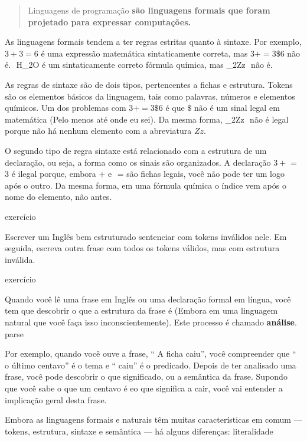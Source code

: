 \documentclass[10pt]{book}
\begin{document}
\begin{quote}
{Linguagens de programação \bf são linguagens formais que foram
projetado para expressar computações.}
\end{quote}

As linguagens formais tendem a ter regras estritas quanto à sintaxe. Por exemplo,
$ 3 + 3 = 6 $ é uma expressão matemática sintaticamente correta, mas 
$ 3 + = 3 \mbox {\$} 6 $ não é.
$ $ H_2O é um sintaticamente correto
fórmula química, mas _2Zz $ $ não é.

As regras de sintaxe são de dois tipos, pertencentes a {fichas \bf} e
estrutura. Tokens são os elementos básicos da linguagem, tais como
palavras, números e elementos químicos. Um dos problemas com
$ 3 + = 3 \mbox {\$} 6 $ é que \(\$ \) não é um sinal legal em matemática
(Pelo menos até onde eu sei). Da mesma forma, _2Zz $ $ não é legal porque
não há nenhum elemento com a abreviatura $ Zz $.

O segundo tipo de regra sintaxe está relacionado com a estrutura de um
declaração, ou seja, a forma como os sinais são organizados. A declaração
$ 3 + $ = 3 é ilegal porque, embora $ + $ e $ $ = são
fichas legais, você não pode ter um logo após o outro. Da mesma forma,
em uma fórmula química o índice vem após o nome do elemento, não
antes.

\begin{} exercício

Escrever um Inglês bem estruturado
sentenciar com tokens inválidos nele. Em seguida, escreva outra frase
com todos os tokens válidos, mas com estrutura inválida.

\end{} exercício

Quando você lê uma frase em Inglês ou uma declaração formal em
língua, você tem que descobrir o que a estrutura da frase é
(Embora em uma linguagem natural que você faça isso inconscientemente). Este
processo é chamado {\bf análise}.
\index{} parse

Por exemplo, quando você ouve a frase, `` A ficha caiu'', você
compreender que `` o último centavo'' é o tema e `` caiu'' é o
predicado. Depois de ter analisado uma frase, você pode descobrir o que
significado, ou a semântica da frase. Supondo que você sabe
o que um centavo é eo que significa a cair, você vai entender a
implicação geral desta frase.

Embora as linguagens formais e naturais têm muitas características em
comum --- tokens, estrutura, sintaxe e semântica --- há alguns
diferenças:
\index{} literalidade
\end{document}
